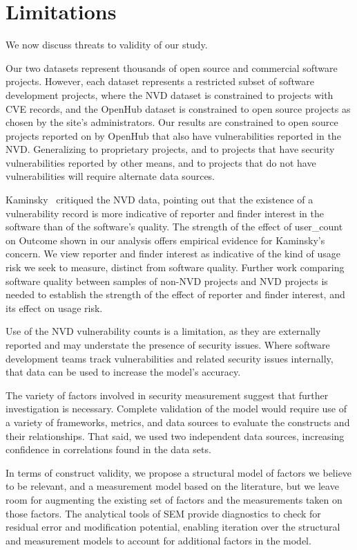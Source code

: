 \section{Limitations}
\label{sec:limitations}

We now discuss threats to validity of our study.

Our two datasets represent thousands of open source and commercial software projects. However, each dataset represents a restricted subset of software development projects, where the NVD dataset is constrained to projects with CVE records, and the OpenHub dataset is constrained to open source projects as chosen by the site's administrators. Our results are constrained to open source projects reported on by OpenHub that also have vulnerabilities reported in the NVD. Generalizing to proprietary projects, and to projects that have security vulnerabilities reported by other means, and to projects that do not have vulnerabilities will require alternate data sources.     

Kaminsky~\cite{kaminsky2011showing} critiqued the NVD data, pointing out that the existence of a vulnerability record is more indicative of reporter and finder interest in the software than of the software's quality. The strength of the effect of user\_count on Outcome shown in our analysis offers empirical evidence for Kaminsky's concern. We view reporter and finder interest as indicative of the kind of usage risk we seek to measure, distinct from software quality. Further work comparing software quality between samples of non-NVD projects and NVD projects is needed to establish the strength of the effect of reporter and finder interest, and its effect on usage risk. 

Use of the NVD vulnerability counts is a limitation, as they are externally reported and may understate the presence of security issues. Where software development teams track vulnerabilities and related security issues internally, that data can be used to increase the model's accuracy.

The variety of factors involved in security measurement suggest that further investigation is necessary. Complete validation of the model would require use of a variety of frameworks, metrics, and data sources to evaluate the constructs and their relationships. That said, we used two independent data sources, increasing confidence in correlations found in the data sets. 

In terms of construct validity, we propose a structural model of factors we believe to be relevant, and a measurement model based on the literature, but we leave room for augmenting the existing set of factors and the measurements taken on those factors. The analytical tools of SEM provide diagnostics to check for residual error and modification potential, enabling iteration over the structural and measurement models to account for additional factors in the model. 
  
